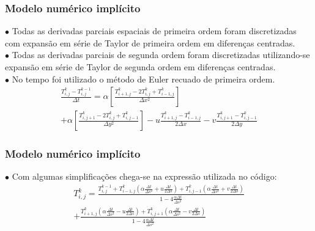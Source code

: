 \documentclass[xcolor=dvipsnames,10pt,aspectratio=169]{beamer}
\begin{document}
	\begin{frame} 
		\frametitle{Modelo numérico implícito}
		$\bullet$ Todas as derivadas parciais espaciais de primeira ordem foram discretizadas com expansão em série de Taylor de primeira ordem em diferenças centradas.\\
		$\bullet$ Todas as derivadas parciais de segunda ordem foram discretizadas utilizando-se expansão em série de Taylor de segunda ordem em diferenças centradas.\\
		$\bullet$ No tempo foi utilizado o método de Euler recuado de primeira ordem.\\
		\begin{equation}
			\begin{split}
			\frac{T_{i,j}^{k} - T_{i , j}^{k-1} }{\Delta t}
			= \alpha \left[  \frac{T_{i+1,j}^{k} - 2 T_{i,j}^{k} + T_{i-1,j}^{k} }{\Delta x^2} \right]\\
			+\alpha \left[\frac{T_{i,j+1}^{k} - 2 T_{i,j}^{k} + T_{i,j-1}^{k}}{\Delta y^2}\right] - u \frac{T_{i+1,j}^{k} - T_{i-1,j}^{k}}{2 \Delta x} - v \frac{T_{i,j+1}^{k} - T_{i , j-1}^{k}}{2 \Delta y}  
			\end{split}
		\end{equation}
	\end{frame}





	\begin{frame} 
		\frametitle{Modelo numérico implícito}
		$\bullet$ Com algumas simplificações chega-se na expressão utilizada no código:
		\begin{equation}
			\begin{split}
			T_{i,j}^{k} = \frac{T_{i,j}^{k-1} + T_{i -1, j}^{k} \left( \alpha \frac{\Delta t}{\Delta s^2} + u \frac{\Delta t}{2 \Delta s} \right) 	+ T_{i,j-1}^{k} \left( \alpha \frac{\Delta t}{\Delta s^2} + v \frac{\Delta t}{2 \Delta s} \right)}{ 1 - 4 \frac{\alpha \Delta t}{\Delta s ^2}} \\
			+ \frac{  T_{i+1,j}^{k} \left( \alpha \frac{\Delta t}{ \Delta s^2} - u \frac{\Delta t}{2 \Delta s}\right) 
			+  T_{i,j+1}^{k} \left( \alpha \frac{\Delta t}{\Delta s^2} - v \frac{\Delta t}{2 \Delta s}\right)}{ 1 - 4 \frac{\alpha \Delta t}{\Delta s ^2}}
			\end{split}
		\end{equation}
	\end{frame}
\end{document}
